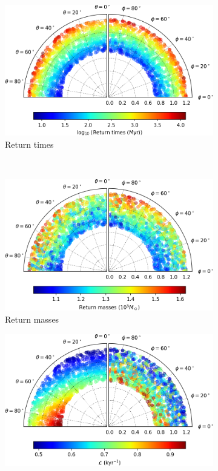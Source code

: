 \begin{figure}[h]
    \centering
    \begin{subfigure}[t]{0.4\textwidth}
        \includegraphics[width = \textwidth]{"../Files/Week 13/images/26_time"}
        \caption{Return times}
    \end{subfigure}
    ~ 
    \begin{subfigure}[t]{0.4\textwidth}
        \includegraphics[width=\textwidth]{"../Files/Week 13/images/26_mass"}
        \caption{Return masses}
    \end{subfigure}
    \begin{subfigure}[t]{0.4\textwidth}
        \includegraphics[width=\textwidth]{"../Files/Week 13/images/26_lyapunov"}

\end{subfigure}
\end{figure}
